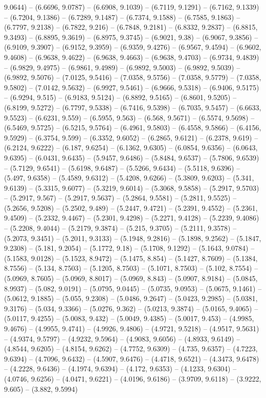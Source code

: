 9.0644) -- (6.6696, 9.0787) -- (6.6908, 9.1039) -- (6.7119, 9.1291) -- (6.7162, 9.1339) -- (6.7204, 9.1386) -- (6.7289, 9.1487) -- (6.7374, 9.1588) -- (6.7585, 9.1863) -- (6.7797, 9.2138) -- (6.7822, 9.216) -- (6.7848, 9.2181) -- (6.8332, 9.2837) -- (6.8815, 9.3493) -- (6.8895, 9.3619) -- (6.8975, 9.3745) -- (6.9021, 9.38) -- (6.9067, 9.3856) -- (6.9109, 9.3907) -- (6.9152, 9.3959) -- (6.9359, 9.4276) -- (6.9567, 9.4594) -- (6.9602, 9.4608) -- (6.9638, 9.4622) -- (6.9638, 9.4663) -- (6.9638, 9.4703) -- (6.9734, 9.4839) -- (6.9829, 9.4975) -- (6.9861, 9.4989) -- (6.9892, 9.5003) -- (6.9892, 9.5039) -- (6.9892, 9.5076) -- (7.0125, 9.5416) -- (7.0358, 9.5756) -- (7.0358, 9.5779) -- (7.0358, 9.5802) -- (7.0142, 9.5632) -- (6.9927, 9.5461) -- (6.9666, 9.5318) -- (6.9406, 9.5175) -- (6.9294, 9.515) -- (6.9183, 9.5124) -- (6.8892, 9.5165) -- (6.8601, 9.5205) -- (6.8199, 9.5272) -- (6.7797, 9.5338) -- (6.7416, 9.5398) -- (6.7035, 9.5457) -- (6.6633, 9.5523) -- (6.6231, 9.559) -- (6.5955, 9.563) -- (6.568, 9.5671) -- (6.5574, 9.5698) -- (6.5469, 9.5725) -- (6.5215, 9.5764) -- (6.4961, 9.5803) -- (6.4558, 9.5866) -- (6.4156, 9.5929) -- (6.3754, 9.599) -- (6.3352, 9.6052) -- (6.2865, 9.6121) -- (6.2378, 9.619) -- (6.2124, 9.6222) -- (6.187, 9.6254) -- (6.1362, 9.6305) -- (6.0854, 9.6356) -- (6.0643, 9.6395) -- (6.0431, 9.6435) -- (5.9457, 9.6486) -- (5.8484, 9.6537) -- (5.7806, 9.6539) -- (5.7129, 9.6541) -- (5.6198, 9.6487) -- (5.5266, 9.6434) -- (5.5118, 9.6396) -- (5.497, 9.6358) -- (5.4589, 9.6312) -- (5.4208, 9.6266) -- (5.3809, 9.6203) -- (5.341, 9.6139) -- (5.3315, 9.6077) -- (5.3219, 9.6014) -- (5.3068, 9.5858) -- (5.2917, 9.5703) -- (5.2917, 9.567) -- (5.2917, 9.5637) -- (5.2864, 9.5581) -- (5.2811, 9.5525) -- (5.2656, 9.5208) -- (5.2502, 9.489) -- (5.2447, 9.4721) -- (5.2391, 9.4552) -- (5.2361, 9.4509) -- (5.2332, 9.4467) -- (5.2301, 9.4298) -- (5.2271, 9.4128) -- (5.2239, 9.4086) -- (5.2208, 9.4044) -- (5.2179, 9.3874) -- (5.215, 9.3705) -- (5.2111, 9.3578) -- (5.2073, 9.3451) -- (5.2011, 9.3133) -- (5.1948, 9.2816) -- (5.1898, 9.2562) -- (5.1847, 9.2308) -- (5.181, 9.2054) -- (5.1772, 9.18) -- (5.1708, 9.1292) -- (5.1643, 9.0784) -- (5.1583, 9.0128) -- (5.1523, 8.9472) -- (5.1475, 8.854) -- (5.1427, 8.7609) -- (5.1384, 8.7556) -- (5.134, 8.7503) -- (5.1205, 8.7503) -- (5.1071, 8.7503) -- (5.102, 8.7554) -- (5.0969, 8.7605) -- (5.0969, 8.8017) -- (5.0969, 8.843) -- (5.0907, 8.9184) -- (5.0845, 8.9937) -- (5.082, 9.0191) -- (5.0795, 9.0445) -- (5.0735, 9.0953) -- (5.0675, 9.1461) -- (5.0612, 9.1885) -- (5.055, 9.2308) -- (5.0486, 9.2647) -- (5.0423, 9.2985) -- (5.0381, 9.3176) -- (5.034, 9.3366) -- (5.0276, 9.362) -- (5.0213, 9.3874) -- (5.0165, 9.4065) -- (5.0117, 9.4255) -- (5.0083, 9.432) -- (5.0049, 9.4385) -- (5.0017, 9.453) -- (4.9985, 9.4676) -- (4.9955, 9.4741) -- (4.9926, 9.4806) -- (4.9721, 9.5218) -- (4.9517, 9.5631) -- (4.9374, 9.5797) -- (4.9232, 9.5964) -- (4.9083, 9.6056) -- (4.8933, 9.6149) -- (4.8544, 9.6205) -- (4.8154, 9.6262) -- (4.7752, 9.6309) -- (4.735, 9.6357) -- (4.7223, 9.6394) -- (4.7096, 9.6432) -- (4.5907, 9.6476) -- (4.4718, 9.6521) -- (4.3473, 9.6478) -- (4.2228, 9.6436) -- (4.1974, 9.6394) -- (4.172, 9.6353) -- (4.1233, 9.6304) -- (4.0746, 9.6256) -- (4.0471, 9.6221) -- (4.0196, 9.6186) -- (3.9709, 9.6118) -- (3.9222, 9.605) -- (3.882, 9.5994) 
